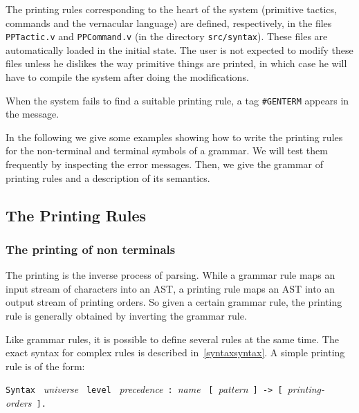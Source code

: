 The printing rules corresponding to the heart of the system (primitive
tactics, commands and the vernacular language) are defined,
respectively, in the files {\tt PPTactic.v} and {\tt PPCommand.v}
(in the directory {\tt src/syntax}). These files are automatically
loaded in the initial state. The user is not expected to modify these
files unless he dislikes the way primitive things are printed, in
which case he will have to compile the system after doing the
modifications.

When the system fails to find a suitable printing rule, a tag
\verb+#GENTERM+ appears in the message.

In the following we give some examples showing how to write the
printing rules for the non-terminal and terminal symbols of a
grammar. We will test them frequently by inspecting the error
messages.  Then, we give the grammar of printing rules and a
description of its semantics.


\subsection{The Printing Rules}
\subsubsection{The printing of non terminals}

The printing is the inverse process of parsing. While a grammar rule
maps an input stream of characters
into an AST, a printing
rule maps an AST into an output stream of printing orders. 
So given a certain grammar rule, the printing rule 
is generally obtained by inverting the grammar rule.

Like grammar rules, it is possible to define several rules at the same
time. The exact syntax for complex rules is described
in~\ref{syntaxsyntax}. A simple printing rule is of the form:

\begin{center}
\verb+Syntax+ ~{\sl universe}
~\verb+level+ ~{\sl precedence}~\verb+:+~{\sl name}
~\verb+[+~{\sl pattern}~\verb+] -> [+~{\sl printing-orders}~\verb+].+
\end{center}

